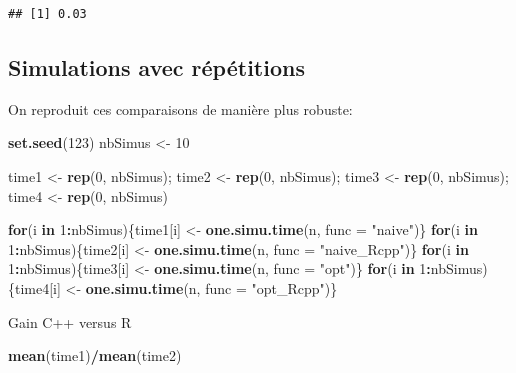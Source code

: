\documentclass[
]{article}
\newenvironment{Shaded}{\begin{snugshade}}{\end{snugshade}}
\newcommand{\AttributeTok}[1]{\textcolor[rgb]{0.13,0.29,0.53}{#1}}
\newcommand{\ControlFlowTok}[1]{\textcolor[rgb]{0.13,0.29,0.53}{\textbf{#1}}}
\newcommand{\DecValTok}[1]{\textcolor[rgb]{0.00,0.00,0.81}{#1}}
\newcommand{\FunctionTok}[1]{\textcolor[rgb]{0.13,0.29,0.53}{\textbf{#1}}}
\newcommand{\NormalTok}[1]{#1}
\newcommand{\OtherTok}[1]{\textcolor[rgb]{0.56,0.35,0.01}{#1}}
\newcommand{\SpecialCharTok}[1]{\textcolor[rgb]{0.81,0.36,0.00}{\textbf{#1}}}
\newcommand{\StringTok}[1]{\textcolor[rgb]{0.31,0.60,0.02}{#1}}
\begin{document}
\begin{verbatim}
## [1] 0.03
\end{verbatim}

\subsection{Simulations avec
répétitions}\label{simulations-avec-ruxe9puxe9titions}

On reproduit ces comparaisons de manière plus robuste:

\begin{Shaded}
\begin{Highlighting}[]
\FunctionTok{set.seed}\NormalTok{(}\DecValTok{123}\NormalTok{)}
\NormalTok{nbSimus }\OtherTok{\textless{}{-}} \DecValTok{10}

\NormalTok{time1 }\OtherTok{\textless{}{-}} \FunctionTok{rep}\NormalTok{(}\DecValTok{0}\NormalTok{, nbSimus); time2 }\OtherTok{\textless{}{-}} \FunctionTok{rep}\NormalTok{(}\DecValTok{0}\NormalTok{, nbSimus);}
\NormalTok{time3 }\OtherTok{\textless{}{-}} \FunctionTok{rep}\NormalTok{(}\DecValTok{0}\NormalTok{, nbSimus); time4 }\OtherTok{\textless{}{-}} \FunctionTok{rep}\NormalTok{(}\DecValTok{0}\NormalTok{, nbSimus)}

\ControlFlowTok{for}\NormalTok{(i }\ControlFlowTok{in} \DecValTok{1}\SpecialCharTok{:}\NormalTok{nbSimus)\{time1[i] }\OtherTok{\textless{}{-}} \FunctionTok{one.simu.time}\NormalTok{(n, }\AttributeTok{func =} \StringTok{"naive"}\NormalTok{)\}}
\ControlFlowTok{for}\NormalTok{(i }\ControlFlowTok{in} \DecValTok{1}\SpecialCharTok{:}\NormalTok{nbSimus)\{time2[i] }\OtherTok{\textless{}{-}} \FunctionTok{one.simu.time}\NormalTok{(n, }\AttributeTok{func =} \StringTok{"naive\_Rcpp"}\NormalTok{)\}}
\ControlFlowTok{for}\NormalTok{(i }\ControlFlowTok{in} \DecValTok{1}\SpecialCharTok{:}\NormalTok{nbSimus)\{time3[i] }\OtherTok{\textless{}{-}} \FunctionTok{one.simu.time}\NormalTok{(n, }\AttributeTok{func =} \StringTok{"opt"}\NormalTok{)\}}
\ControlFlowTok{for}\NormalTok{(i }\ControlFlowTok{in} \DecValTok{1}\SpecialCharTok{:}\NormalTok{nbSimus)\{time4[i] }\OtherTok{\textless{}{-}} \FunctionTok{one.simu.time}\NormalTok{(n, }\AttributeTok{func =} \StringTok{"opt\_Rcpp"}\NormalTok{)\}}
\end{Highlighting}
\end{Shaded}

Gain C++ versus R

\begin{Shaded}
\begin{Highlighting}[]
\FunctionTok{mean}\NormalTok{(time1)}\SpecialCharTok{/}\FunctionTok{mean}\NormalTok{(time2)}
\end{Highlighting}
\end{Shaded}
\end{document}
